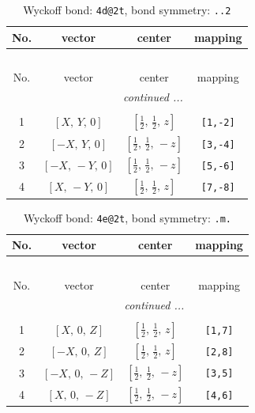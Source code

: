 \documentclass[fleqn,8pt]{jsarticle}
\begin{document}
\begin{longtable}{cccc}
\caption{Wyckoff bond: {\tt 4d@2t}, bond symmetry: {\tt ..2}}
 \\
 \hline \hline
No. & vector & center & mapping \\ \hline \endfirsthead

\multicolumn{3}{l}{\tablename\ \thetable{}} \\
 \hline \hline
No. & vector & center & mapping \\ \hline \endhead

 \hline \hline
\multicolumn{3}{r}{\footnotesize\it continued ...} \\ \endfoot

 \hline \hline
\multicolumn{3}{r}{} \\ \endlastfoot

1 & $\left[ X,\, Y,\, 0 \right]$ & $\left[ \frac{1}{2},\, \frac{1}{2},\, z \right]$ & {\tt [1,-2]} \\ \hline
2 & $\left[ - X,\, Y,\, 0 \right]$ & $\left[ \frac{1}{2},\, \frac{1}{2},\, - z \right]$ & {\tt [3,-4]} \\ \hline
3 & $\left[ - X,\, - Y,\, 0 \right]$ & $\left[ \frac{1}{2},\, \frac{1}{2},\, - z \right]$ & {\tt [5,-6]} \\ \hline
4 & $\left[ X,\, - Y,\, 0 \right]$ & $\left[ \frac{1}{2},\, \frac{1}{2},\, z \right]$ & {\tt [7,-8]} \\
\end{longtable}
\renewcommand{\arraystretch}{1.2}
\begin{longtable}{cccc}
\caption{Wyckoff bond: {\tt 4e@2t}, bond symmetry: {\tt .m.}}
 \\
 \hline \hline
No. & vector & center & mapping \\ \hline \endfirsthead

\multicolumn{3}{l}{\tablename\ \thetable{}} \\
 \hline \hline
No. & vector & center & mapping \\ \hline \endhead

 \hline \hline
\multicolumn{3}{r}{\footnotesize\it continued ...} \\ \endfoot

 \hline \hline
\multicolumn{3}{r}{} \\ \endlastfoot

1 & $\left[ X,\, 0,\, Z \right]$ & $\left[ \frac{1}{2},\, \frac{1}{2},\, z \right]$ & {\tt [1,7]} \\ \hline
2 & $\left[ - X,\, 0,\, Z \right]$ & $\left[ \frac{1}{2},\, \frac{1}{2},\, z \right]$ & {\tt [2,8]} \\ \hline
3 & $\left[ - X,\, 0,\, - Z \right]$ & $\left[ \frac{1}{2},\, \frac{1}{2},\, - z \right]$ & {\tt [3,5]} \\ \hline
4 & $\left[ X,\, 0,\, - Z \right]$ & $\left[ \frac{1}{2},\, \frac{1}{2},\, - z \right]$ & {\tt [4,6]} \\
\end{longtable}
\end{document}
